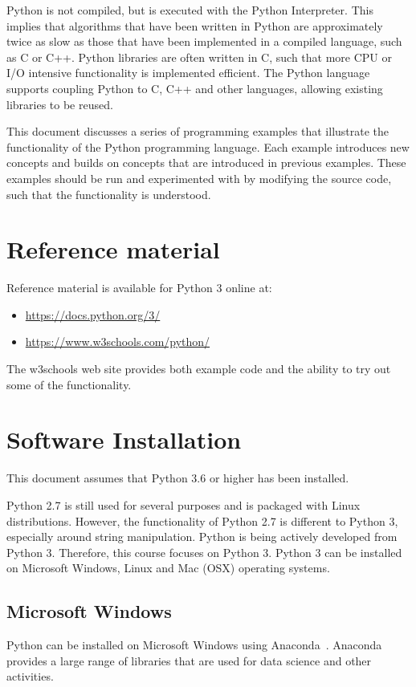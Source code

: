 \documentclass[11pt,a4paper]{article}
\begin{document}
Python is not compiled, but is executed with the Python Interpreter.  This implies that algorithms that have been written in Python are approximately twice as slow as those that have been implemented in a compiled language, such as C or C++.  Python libraries are often written in C, such that more CPU or I/O intensive functionality is implemented efficient.  The Python language supports coupling Python to C, C++ and other languages, allowing existing libraries to be reused.

This document discusses a series of programming examples that illustrate the functionality of the Python programming language.  Each example introduces new concepts and builds on concepts that are introduced in previous examples.  These examples should be run and experimented with by modifying the source code, such that the functionality is understood.

\section{Reference material}

Reference material is available for Python 3 online at:
%
\begin{itemize}
\item \href{https://docs.python.org/3/}{https://docs.python.org/3/}~\cite{python-doc}
\item \href{https://www.w3schools.com/python/}{https://www.w3schools.com/python/}~\cite{python-w3schools}
\end{itemize}
%
The w3schools web site provides both example code and the ability to try out some of the functionality.

\section{Software Installation}
This document assumes that Python 3.6 or higher has been installed.

Python 2.7 is still used for several purposes and is packaged with Linux distributions.  However, the functionality of Python 2.7 is different to Python 3, especially around string manipulation.  Python is being actively developed from Python 3.  Therefore, this course focuses on Python 3.  Python 3 can be installed on Microsoft Windows, Linux and Mac (OSX) operating systems.

\subsection{Microsoft Windows}
Python can be installed on Microsoft Windows using Anaconda~\cite{anaconda}.  Anaconda provides a large range of libraries that are used for data science and other activities.
\end{document}
